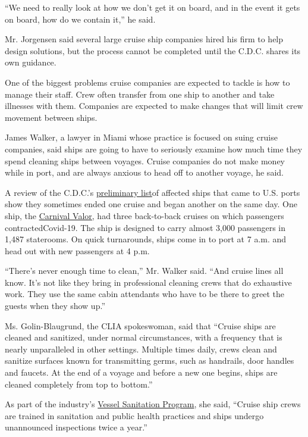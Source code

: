 ``We need to really look at how we don't get it on board, and in the
event it gets on board, how do we contain it,'' he said.

Mr. Jorgensen said several large cruise ship companies hired his firm to
help design solutions, but the process cannot be completed until the
C.D.C. shares its own guidance.

One of the biggest problems cruise companies are expected to tackle is
how to manage their staff. Crew often transfer from one ship to another
and take illnesses with them. Companies are expected to make changes
that will limit crew movement between ships.

James Walker, a lawyer in Miami whose practice is focused on suing
cruise companies, said ships are going to have to seriously examine how
much time they spend cleaning ships between voyages. Cruise companies do
not make money while in port, and are always anxious to head off to
another voyage, he said.

A review of the C.D.C.'s
\href{https://www.cdc.gov/coronavirus/2019-ncov/travelers/cruise-ship/what-cdc-is-doing.html}{preliminary
list}of affected ships that came to U.S. ports show they sometimes ended
one cruise and began another on the same day. One ship, the
\href{https://www.carnival.com/cruise-ships/carnival-valor.aspx}{Carnival
Valor,} had three back-to-back cruises on which passengers
contractedCovid-19. The ship is designed to carry almost 3,000
passengers in 1,487 staterooms. On quick turnarounds, ships come in to
port at 7 a.m. and head out with new passengers at 4 p.m.

``There's never enough time to clean,'' Mr. Walker said. ``And cruise
lines all know. It's not like they bring in professional cleaning crews
that do exhaustive work. They use the same cabin attendants who have to
be there to greet the guests when they show up.''

Ms. Golin-Blaugrund, the CLIA spokeswoman, said that ``Cruise ships are
cleaned and sanitized, under normal circumstances, with a frequency that
is nearly unparalleled in other settings. Multiple times daily, crews
clean and sanitize surfaces known for transmitting germs, such as
handrails, door handles and faucets. At the end of a voyage and before a
new one begins, ships are cleaned completely from top to bottom.''

As part of the industry's
\href{https://nam11.safelinks.protection.outlook.com/?url=https\%3A\%2F\%2Fwww.cdc.gov\%2Fnceh\%2Fvsp\%2Fdefault.htm\&data=02\%7C01\%7Cpress\%40cruising.org\%7C50fb50d31a3448536ad408d7f7873525\%7C53537f9f6e52441c8cbffc4bae13ff1d\%7C0\%7C0\%7C637250032412483411\&sdata=B1sH\%2FMKUa5XSrjUz5ujv78K37RgqCOoe0ST0dbx\%2FVYo\%3D\&reserved=0}{Vessel
Sanitation Program}, she said, ``Cruise ship crews are trained in
sanitation and public health practices and ships undergo unannounced
inspections twice a year.''

